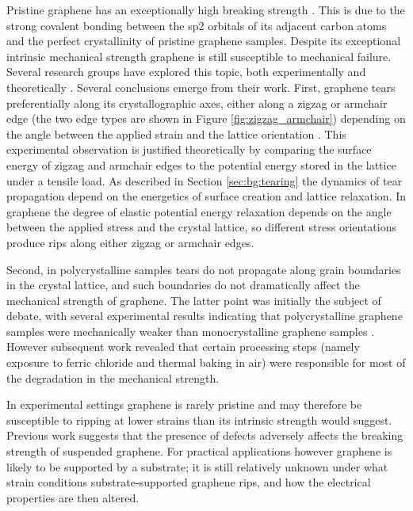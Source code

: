 \documentclass[edeposit,fullpage,draftthesis]{uiucthesis2009}
\begin{document}
        Pristine graphene has an exceptionally high breaking strength \cite{Lee2008}.
        This is due to the strong covalent bonding between the sp2 orbitals of its
        adjacent carbon atoms and the perfect crystallinity of pristine graphene samples.
        Despite its exceptional intrinsic mechanical strength graphene is still susceptible to mechanical failure.
        Several research groups have explored this topic, both experimentally
        \cite{huang2011grains, ruiz2011softened, lee2013high} and theoretically 
        \cite{zhao2010temperature, wang2012effect, terdalkar2010nanoscale}.
        Several conclusions emerge from their work. First, graphene tears preferentially along its 
        crystallographic axes, either along a zigzag or armchair edge (the two edge types are shown
        in Figure \ref{fig:zigzag_armchair}) depending
        on the angle between the applied strain and the lattice orientation \cite{kim2011ripping}. 
        This experimental observation is justified theoretically by comparing the surface
        energy of zigzag and armchair edges to the potential energy stored in the lattice under a tensile load.
        As described in Section \ref{sec:bg:tearing} the dynamics of tear propagation 
        depend on the energetics of surface creation and lattice relaxation. 
        In graphene the degree of elastic potential energy relaxation depends on the angle between the applied stress and
        the crystal lattice, so different stress orientations produce rips along either zigzag or armchair edges.
        
        Second, in polycrystalline samples tears do not propagate along grain boundaries in the crystal lattice, and such
        boundaries do not dramatically affect the mechanical strength of graphene. The latter point
        was initially the subject of debate, with several experimental results indicating that polycrystalline
        graphene samples  were mechanically weaker than monocrystalline graphene samples \cite{huang2011grains,ruiz2011softened}.
        However subsequent work \cite{lee2013high, rasool2013measurement} revealed that certain processing steps 
        (namely exposure to 
        ferric chloride and thermal baking in air) were responsible for most of the degradation in the mechanical strength.
 
        In experimental settings graphene is rarely pristine and may therefore
        be susceptible to ripping at lower strains than its intrinsic strength would suggest. 
        Previous work suggests that the presence of defects 
        \cite{Kim2012, zandiatashbar2014effect, huang2011grains, lee2013high} 
        adversely affects the breaking strength of suspended graphene. 
        For practical applications however graphene is likely to be supported by a substrate;
        it is still relatively unknown under what strain conditions substrate-supported
        graphene rips, and how the electrical properties are then altered.
        
\end{document}
